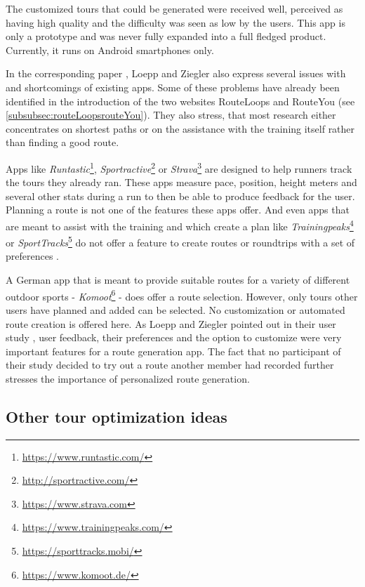 The customized tours that could be generated were received well, perceived as having high quality and the difficulty was seen as low by the users.
This app is only a prototype and was never fully expanded into a full fledged product.
Currently, it runs on Android smartphones only. 

In the corresponding paper \cite{loepp_recommending_2018}, Loepp and Ziegler also express several issues with and shortcomings of existing apps.
Some of these problems have already been identified in the introduction of the two websites RouteLoops and RouteYou (see \ref{subsubsec:routeLoopsrouteYou}).
They also stress, that most research either concentrates on shortest paths or on the assistance with the training itself rather than finding a good route.

Apps like \textit{Runtastic}\footnote{\url{https://www.runtastic.com/}}, \textit{Sportractive}\footnote{\url{http://sportractive.com/}} or \textit{Strava}\footnote{\url{https://www.strava.com}} are designed to help runners track the tours they already ran. 
These apps measure pace, position, height meters and several other stats during a run to then be able to produce feedback for the user. 
Planning a route is not one of the features these apps offer.
And even apps that are meant to assist with the training and which create a plan like \textit{Trainingpeaks}\footnote{\url{https://www.trainingpeaks.com/}} or \textit{SportTracks}\footnote{\url{https://sporttracks.mobi/}} do not offer a feature to create routes or roundtrips with a set of preferences \cite{loepp_recommending_2018}.

A German app that is meant to provide suitable routes for a variety of different outdoor sports - \textit{Komoot}\footnote{\url{https://www.komoot.de/}} - does offer a route selection. 
However, only tours other users have planned and added can be selected. 
No customization or automated route creation is offered here. 
As Loepp and Ziegler pointed out in their user study \cite{loepp_recommending_2018}, user feedback, their preferences and the option to customize were very important features for a route generation app. 
The fact that no participant of their study decided to try out a route another member had recorded further stresses the importance of personalized route generation.


\subsection{Other tour optimization ideas}
\label{subsec:otherTourOptimization}

